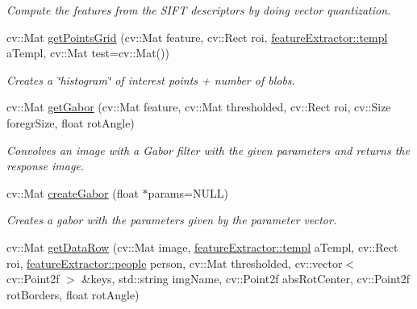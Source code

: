 \begin{DoxyCompactItemize}
\begin{DoxyCompactList}\small\item\em Compute the features from the SIFT descriptors by doing vector quantization. \item\end{DoxyCompactList}\item 
\hypertarget{classfeatureExtractor_a1a278935bd53768b275edbc60f12f5f4}{
cv::Mat \hyperlink{classfeatureExtractor_a1a278935bd53768b275edbc60f12f5f4}{getPointsGrid} (cv::Mat feature, cv::Rect roi, \hyperlink{structfeatureExtractor_1_1templ}{featureExtractor::templ} aTempl, cv::Mat test=cv::Mat())}
\label{classfeatureExtractor_a1a278935bd53768b275edbc60f12f5f4}

\begin{DoxyCompactList}\small\item\em Creates a \char`\"{}histogram\char`\"{} of interest points + number of blobs. \item\end{DoxyCompactList}\item 
\hypertarget{classfeatureExtractor_aacf5712bf8beea34f835ce3b499fee25}{
cv::Mat \hyperlink{classfeatureExtractor_aacf5712bf8beea34f835ce3b499fee25}{getGabor} (cv::Mat feature, cv::Mat thresholded, cv::Rect roi, cv::Size foregrSize, float rotAngle)}
\label{classfeatureExtractor_aacf5712bf8beea34f835ce3b499fee25}

\begin{DoxyCompactList}\small\item\em Convolves an image with a Gabor filter with the given parameters and returns the response image. \item\end{DoxyCompactList}\item 
\hypertarget{classfeatureExtractor_a83dcac28fd134cc72ad93fd207bef1be}{
cv::Mat \hyperlink{classfeatureExtractor_a83dcac28fd134cc72ad93fd207bef1be}{createGabor} (float $\ast$params=NULL)}
\label{classfeatureExtractor_a83dcac28fd134cc72ad93fd207bef1be}

\begin{DoxyCompactList}\small\item\em Creates a gabor with the parameters given by the parameter vector. \item\end{DoxyCompactList}\item 
\hypertarget{classfeatureExtractor_a586b7275a6e950396270cc910a71694d}{
cv::Mat \hyperlink{classfeatureExtractor_a586b7275a6e950396270cc910a71694d}{getDataRow} (cv::Mat image, \hyperlink{structfeatureExtractor_1_1templ}{featureExtractor::templ} aTempl, cv::Rect roi, \hyperlink{structfeatureExtractor_1_1people}{featureExtractor::people} person, cv::Mat thresholded, cv::vector$<$ cv::Point2f $>$ \&keys, std::string imgName, cv::Point2f absRotCenter, cv::Point2f rotBorders, float rotAngle)}
\label{classfeatureExtractor_a586b7275a6e950396270cc910a71694d}


\end{DoxyCompactItemize}
